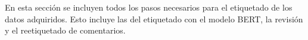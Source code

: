 En esta sección se incluyen todos los pasos necesarios para el etiquetado de los datos adquiridos. Esto incluye las del etiquetado con el modelo BERT, la revisión y el reetiquetado de comentarios.
